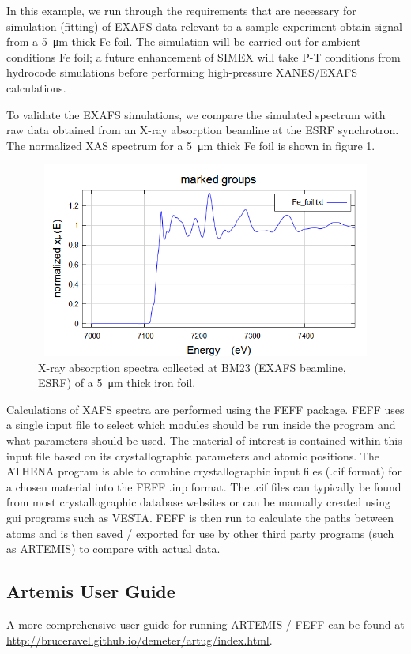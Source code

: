 In this example, we run through the requirements that are necessary for
simulation (fitting) of EXAFS data relevant to a sample experiment obtain signal
from a \SI{5}{\micro\metre} thick Fe foil. The simulation will be carried out for
ambient conditions Fe foil; a future enhancement of SIMEX will take P-T
conditions from hydrocode simulations before performing high-pressure
XANES/EXAFS calculations.

To validate the EXAFS simulations, we compare the simulated spectrum with raw
data obtained from an X-ray absorption beamline at the ESRF synchrotron. The
normalized XAS spectrum for a \SI{5}{\micro\metre} thick Fe foil is shown in figure 1.
\begin{figure}
  \includegraphics[width=4.822in,height=2.528in]{figures/Task42210-img001.png}
  \caption{%
    X-ray absorption spectra collected at BM23 (EXAFS beamline, ESRF) of
    a \SI{5}{\micro\metre} thick iron foil.%
  }
  \label{fig:xafs_fig1}
\end{figure}
Calculations of XAFS spectra are performed using the FEFF package. FEFF uses a
single input file to select which modules should be run inside the program and
what parameters should be used. The material of interest is contained within
this input file based on its crystallographic parameters and atomic positions.
The ATHENA program is able to combine crystallographic input files (.cif format)
for a chosen material into the FEFF .inp format. The .cif files can typically be
found from most crystallographic database websites or can be manually created
using gui programs such as VESTA. FEFF is then run to calculate the paths
between atoms and is then saved / exported for use by other third party programs
(such as ARTEMIS) to compare with actual data.

\subsection{Artemis User Guide} A more comprehensive user guide for running ARTEMIS
/ FEFF can be found at
\href{http://bruceravel.github.io/demeter/artug/index.html}{http://bruceravel.github.io/demeter/artug/index.html}.

